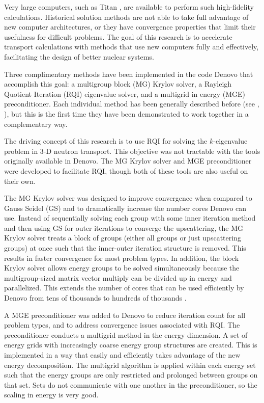 \documentclass{article}                                                                           %
\begin{document}
Very large computers, such as Titan \cite{Titan2013}, are available to perform such high-fidelity calculations. Historical solution methods are not able to take full advantage of new computer architectures, or they have convergence properties that limit their usefulness for difficult problems. The goal of this research is to accelerate transport calculations with methods that use new computers fully and effectively, facilitating the design of better nuclear systems. 

Three complimentary methods have been implemented in the code Denovo \cite{Evans2010} that accomplish this goal: a multigroup block (MG) Krylov solver, a Rayleigh Quotient Iteration (RQI) eigenvalue solver, and a multigrid in energy (MGE) preconditioner. Each individual method has been generally described before (see \cite{Slaybaugh2012}, \cite{Slaybaugh2013}), but this is the first time they have been demonstrated to work together in a complementary way. 

The driving concept of this research is to use RQI for solving the $k$-eigenvalue problem in 3-D neutron transport. This objective was not tractable with the tools originally available in Denovo. The MG Krylov solver and MGE preconditioner were developed to facilitate RQI, though both of these tools are also useful on their own. 

The MG Krylov solver was designed to improve convergence when compared to Gauss Seidel (GS) and to dramatically increase the number cores Denovo can use. Instead of sequentially solving each group with some inner iteration method and then using GS for outer iterations to converge the upscattering, the MG Krylov solver treats a block of groups (either all groups or just upscattering groups) at once such that the inner-outer iteration structure is removed. This results in faster convergence for most problem types. In addition, the block Krylov solver allows energy groups to be solved simultaneously because the multigroup-sized matrix vector multiply can be divided up in energy and parallelized. This extends the number of cores that can be used efficiently by Denovo from tens of thousands to hundreds of thousands \cite{Davidson2013}.

A MGE preconditioner was added to Denovo to reduce iteration count for all problem types, and to address convergence issues associated with RQI. The  preconditioner conducts a multigrid method in the energy dimension. A set of energy grids with increasingly coarse energy group structures are created. This is implemented in a way that easily and efficiently takes advantage of the new energy decomposition. The multigrid algorithm is applied within each energy set such that the energy groups are only restricted and prolonged between groups on that set. Sets do not communicate with one another in the preconditioner, so the scaling in energy is very good. 
\end{document}
